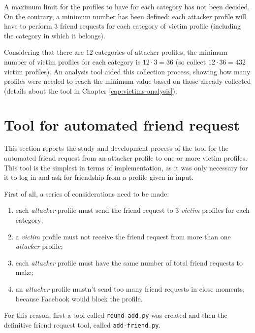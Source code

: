 \par \noindent A maximum limit for the profiles to have for each category has not been decided. On the contrary, a minimum number has been defined: each attacker profile will have to perform 3 friend requests for each category of victim profile (including the category in which it belongs). 
\par \noindent Considering that there are $12$ categories of attacker profiles, the minimum number of victim profiles for each category is $12 \cdot 3 = 36$ (so collect $12 \cdot 36 = 432$ victim profiles). An analysis tool aided this collection process, showing how many profiles were needed to reach the minimum value based on those already collected (details about the tool in Chapter \ref{cap:victims-analysis}). 

\newpage
\section{Tool for automated friend request}
\label{cap:tool-friend-request}
This section reports the study and development process of the tool for the automated friend request from an attacker profile to one or more victim profiles. This tool is the simplest in terms of implementation, as it was only necessary for it to log in and ask for friendship from a profile given in input. \par \noindent  
First of all, a series of considerations need to be made:
\begin{enumerate}
	\item each \textit{attacker} profile must send the friend request to 3 \textit{victim} profiles for each category;
	\item a \textit{victim} profile must not receive the friend request from more than one \textit{attacker} profile;
	\item each \textit{attacker} profile must have the same number of total friend requests to make;
	\item an \textit{attacker} profile mustn't send too many friend requests in close moments, because Facebook would block the profile.
\end{enumerate}
For this reason, first a tool called \texttt{round-add.py} was created and then the definitive friend request tool, called \texttt{add-friend.py}. 

